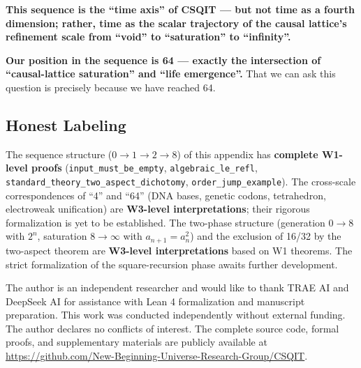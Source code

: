 \documentclass[aps,prd,twocolumn,nofootinbib,floatfix]{revtex4-2}
\begin{document}
\textbf{This sequence is the ``time axis'' of CSQIT --- but not time as a fourth dimension; rather, time as the scalar trajectory of the causal lattice's refinement scale from ``void'' to ``saturation'' to ``infinity''.}

\textbf{Our position in the sequence is 64 --- exactly the intersection of ``causal-lattice saturation'' and ``life emergence''.} That we can ask this question is precisely because we have reached 64.

\subsection{Honest Labeling}

The sequence structure ($0\to 1\to 2\to 8$) of this appendix has \textbf{complete W1-level proofs} (\texttt{input\_must\_be\_empty}, \texttt{algebraic\_le\_refl}, \texttt{standard\_theory\_two\_aspect\_dichotomy}, \texttt{order\_jump\_example}). The cross-scale correspondences of ``4'' and ``64'' (DNA bases, genetic codons, tetrahedron, electroweak unification) are \textbf{W3-level interpretations}; their rigorous formalization is yet to be established. The two-phase structure (generation $0\to 8$ with $2^n$, saturation $8\to \infty$ with $a_{n+1} = a_n^2$) and the exclusion of 16/32 by the two-aspect theorem are \textbf{W3-level interpretations} based on W1 theorems. The strict formalization of the square-recursion phase awaits further development.

\acknowledgments

The author is an independent researcher and would like to thank TRAE AI and DeepSeek AI for assistance with Lean 4 formalization and manuscript preparation. This work was conducted independently without external funding. The author declares no conflicts of interest. The complete source code, formal proofs, and supplementary materials are publicly available at \url{https://github.com/New-Beginning-Universe-Research-Group/CSQIT}.


\end{document}
